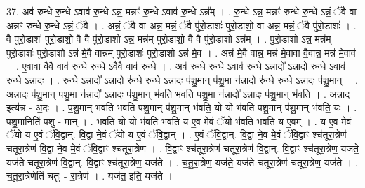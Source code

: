 \documentclass[17pt]{extarticle}
\begin{document}
37. अव॑ रुन्धे रु॒न्धे ऽवाव॑ रु॒न्धे ऽन्न॒ मन्नꣳ॑ रु॒न्धे ऽवाव॑ रु॒न्धे ऽन्न᳚म् । . रु॒न्धे ऽन्न॒ मन्नꣳ॑ रुन्धे रु॒न्धे ऽन्नं॒ ॅवै वा अन्नꣳ॑ रुन्धे रु॒न्धे ऽन्नं॒ ॅवै । . अन्नं॒ ॅवै वा अन्न॒ मन्नं॒ ॅवै पु॑रो॒डाशः॑ पुरो॒डाशो॒ वा अन्न॒ मन्नं॒ ॅवै पु॑रो॒डाशः॑ । . वै पु॑रो॒डाशः॑ पुरो॒डाशो॒ वै वै पु॑रो॒डाशो ऽन्न॒ मन्न॑म् पुरो॒डाशो॒ वै वै पु॑रो॒डाशो ऽन्न᳚म् । . पु॒रो॒डाशो ऽन्न॒ मन्न॑म् पुरो॒डाशः॑ पुरो॒डाशो ऽन्न॑ मे॒वै वान्न॑म् पुरो॒डाशः॑ पुरो॒डाशो ऽन्न॑ मे॒व । . अन्न॑ मे॒वै वान्न॒ मन्न॑ मे॒वावा वै॒वान्न॒ मन्न॑ मे॒वाव॑ । . ए॒वावा वै॒वै वाव॑ रुन्धे रु॒न्धे ऽवै॒वै वाव॑ रुन्धे । . अव॑ रुन्धे रु॒न्धे ऽवाव॑ रुन्धे ऽन्ना॒दो᳚ ऽन्ना॒दो रु॒न्धे ऽवाव॑ रुन्धे ऽन्ना॒दः । . रु॒न्धे॒ ऽन्ना॒दो᳚ ऽन्ना॒दो रु॑न्धे रुन्धे ऽन्ना॒दः प॑शु॒मान् प॑शु॒मा न॑न्ना॒दो रु॑न्धे रुन्धे ऽन्ना॒दः प॑शु॒मान् । . अ॒न्ना॒दः प॑शु॒मान् प॑शु॒मा न॑न्ना॒दो᳚ ऽन्ना॒दः प॑शु॒मान् भ॑वति भवति पशु॒मा न॑न्ना॒दो᳚ ऽन्ना॒दः प॑शु॒मान् भ॑वति । . अ॒न्ना॒द इत्य॑न्न - अ॒दः । . प॒शु॒मान् भ॑वति भवति पशु॒मान् प॑शु॒मान् भ॑वति॒ यो यो भ॑वति पशु॒मान् प॑शु॒मान् भ॑वति॒ यः । . प॒शु॒मानिति॑ पशु - मान् । . भ॒व॒ति॒ यो यो भ॑वति भवति॒ य ए॒व मे॒वं ॅयो भ॑वति भवति॒ य ए॒वम् । . य ए॒व मे॒वं ॅयो य ए॒वं ॅवि॒द्वान्. वि॒द्वा ने॒वं ॅयो य ए॒वं ॅवि॒द्वान् । . ए॒वं ॅवि॒द्वान्. वि॒द्वा ने॒व मे॒वं ॅवि॒द्वाꣳ श्च॑तूरा॒त्रेण॑ चतूरा॒त्रेण॑ वि॒द्वा ने॒व मे॒वं ॅवि॒द्वाꣳ श्च॑तूरा॒त्रेण॑ । . वि॒द्वाꣳ श्च॑तूरा॒त्रेण॑ चतूरा॒त्रेण॑ वि॒द्वान्. वि॒द्वाꣳ श्च॑तूरा॒त्रेण॒ यज॑ते॒ यज॑ते चतूरा॒त्रेण॑ वि॒द्वान्. वि॒द्वाꣳ श्च॑तूरा॒त्रेण॒ यज॑ते । . च॒तू॒रा॒त्रेण॒ यज॑ते॒ यज॑ते चतूरा॒त्रेण॑ चतूरा॒त्रेण॒ यज॑ते । . च॒तू॒रा॒त्रेणेति॑ चतुः - रा॒त्रेण॑ । . यज॑त॒ इति॒ यज॑ते । \newline
\pagebreak
{}
\end{document}
